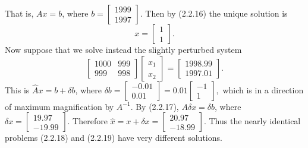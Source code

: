 \documentclass{report}
\begin{document}
\begin{mdframed}
        That is, $Ax = b$, where 
        \(
        b =
        \begin{bmatrix}
            1999 \\
            1997
        \end{bmatrix}.
        \) 
        Then by (2.2.16) the unique solution is
        \[
            x =
            \begin{bmatrix}
                1 \\
                1
            \end{bmatrix}.
        \]
        Now suppose that we solve instead the slightly perturbed system
        \[
            \begin{bmatrix}
                1000 & 999 \\
                999  & 998
            \end{bmatrix}
            \begin{bmatrix}
                \hat{x}_{1} \\
                \hat{x}_{2}
            \end{bmatrix}
            =
            \begin{bmatrix}
                1998.99 \\
                1997.01
            \end{bmatrix}.
            \tag{2.2.19}
        \]
        This is $\hat{A}x = b + \delta b$, where 
        \(
        \delta b =
        \begin{bmatrix}
            -0.01 \\
            0.01
        \end{bmatrix}
        = 0.01
        \begin{bmatrix}
            -1 \\
            1
        \end{bmatrix},
        \)
        which is in a direction of maximum magnification by $A^{-1}$. By (2.2.17), $A\delta x = \delta b$, where 
        \(
        \delta x =
        \begin{bmatrix}
            19.97 \\
            -19.99
        \end{bmatrix}.
        \)
        Therefore 
        \(
        \hat{x} = x + \delta x =
        \begin{bmatrix}
            20.97 \\
            -18.99
        \end{bmatrix}.
        \)
        Thus the nearly identical problems (2.2.18) and (2.2.19) have very different solutions.
    \end{mdframed}
\end{document}
